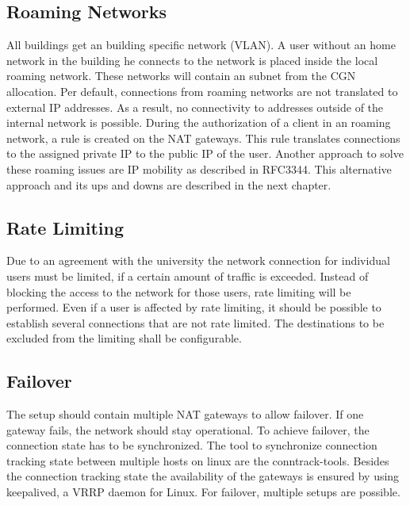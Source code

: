 \documentclass{report}
\begin{document}
\subsection{Roaming Networks}\label{roaming-networks}

All buildings get an building specific network (VLAN). A user without an
home network in the building he connects to the network is placed inside
the local roaming network. These networks will contain an subnet from
the CGN allocation. Per default, connections from roaming networks are
not translated to external IP addresses. As a result, no connectivity to
addresses outside of the internal network is possible. During the
authorization of a client in an roaming network, a rule is created on
the NAT gateways. This rule translates connections to the assigned
private IP to the public IP of the user. Another approach to solve these
roaming issues are IP mobility as described in RFC3344\cite{IPMob}. This alternative
approach and its ups and downs are described in the next chapter.



\subsection{Rate Limiting}\label{rate-limiting}

Due to an agreement with the university the network connection for
individual users must be limited, if a certain amount of traffic is
exceeded. Instead of blocking the access to the network for those users,
rate limiting will be performed. Even if a user is affected by rate
limiting, it should be possible to establish several connections that
are not rate limited. The destinations to be excluded from the limiting
shall be configurable.

\subsection{Failover}\label{failover}

The setup should contain multiple NAT gateways to allow failover. If one
gateway fails, the network should stay operational. To achieve failover,
the connection state has to be synchronized. The tool to synchronize
connection tracking state between multiple hosts on linux are the
conntrack-tools\cite{conntrack-tools}. Besides the connection tracking state the availability
of the gateways is ensured by using keepalived\cite{keepalived}, a VRRP daemon for Linux.
For failover, multiple setups are possible.
\end{document}

